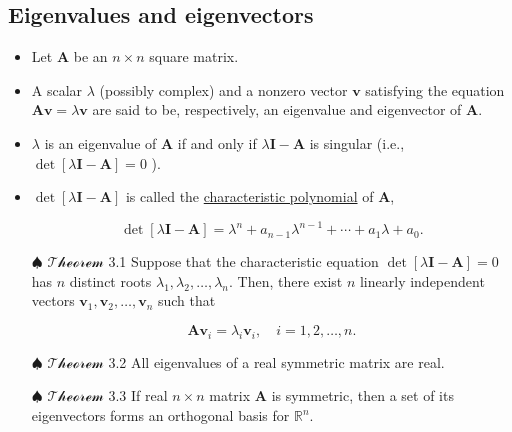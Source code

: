 \documentclass[12pt,thmsa]{article}
\begin{document}
\subsection{Eigenvalues and eigenvectors}
\begin{itemize}
	\item Let \(\boldsymbol{A}\) be an \(n \times n\) square matrix.
	
	\item A scalar \(\lambda\) (possibly complex) and a nonzero vector \(\boldsymbol{v}\) satisfying the equation \(\boldsymbol{A} \boldsymbol{v}=\lambda \boldsymbol{v}\) are said to be, respectively, an eigenvalue and eigenvector of \(\boldsymbol{A}\).
	
	\item \(\lambda\) is an eigenvalue of \(\boldsymbol{A}\) if and only if \(\lambda \boldsymbol{I}-\boldsymbol{A}\) is singular (i.e., \(\operatorname{det}[\lambda \boldsymbol{I}-\boldsymbol{A}]=0\) ).
	
	\item \(\operatorname{det}[\lambda \boldsymbol{I}-\boldsymbol{A}]\) is called the \underline{characteristic polynomial} of \(\boldsymbol{A}\),
	
	\begin{equation*}
		\operatorname{det}[\lambda \boldsymbol{I}-\boldsymbol{A}]=\lambda^{n}+a_{n-1} \lambda^{n-1}+\cdots+a_{1} \lambda+a_{0}.
	\end{equation*}
	
	\item[\(\spadesuit\)] \(\mathcal{Theorem}\) 3.1 Suppose that the characteristic equation \(\operatorname{det}[\lambda \boldsymbol{I}-\boldsymbol{A}]=0\) has \(n\) distinct roots \(\lambda_{1}, \lambda_{2}, \ldots, \lambda_{n}\). Then, there exist \(n\) linearly independent vectors \(\boldsymbol{v}_{1}, \boldsymbol{v}_{2}, \ldots, \boldsymbol{v}_{n}\) such that
	
	\begin{equation*}
		\boldsymbol{A} \boldsymbol{v}_{i}=\lambda_{i} \boldsymbol{v}_{i}, \quad i=1,2, \ldots, n.
	\end{equation*}

	\item[\(\spadesuit\)] \(\mathcal{Theorem}\) 3.2 All eigenvalues of a real symmetric matrix are real.
	
	\item[\(\spadesuit\)] \(\mathcal{Theorem}\) 3.3 If real \( n \times n\) matrix \(\boldsymbol{A}\) is symmetric, then a set of its eigenvectors forms an orthogonal basis for \(\mathbb{R}^{n}\).
	
	
\end{itemize}
\end{document}
